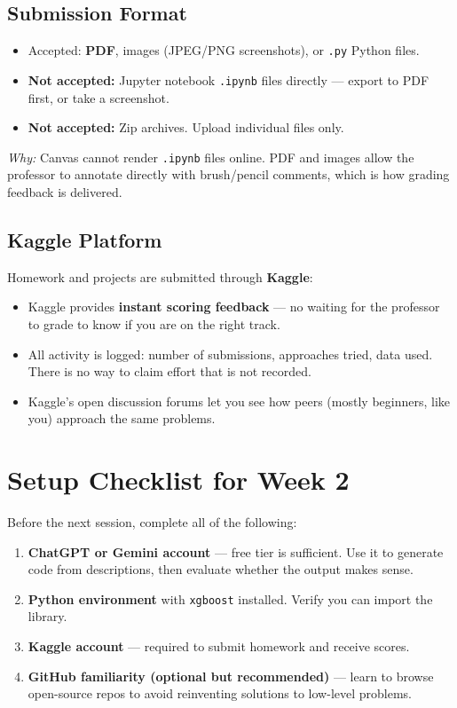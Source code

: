 \documentclass[11pt]{article}
\begin{document}
\subsection{Submission Format}
\begin{itemize}
    \item Accepted: \textbf{PDF}, images (JPEG/PNG screenshots), or \texttt{.py} Python files.
    \item \textbf{Not accepted:} Jupyter notebook \texttt{.ipynb} files directly --- export to PDF first, or take a screenshot.
    \item \textbf{Not accepted:} Zip archives. Upload individual files only.
\end{itemize}

\textit{Why:} Canvas cannot render \texttt{.ipynb} files online. PDF and images allow the professor to annotate directly with brush/pencil comments, which is how grading feedback is delivered.

\subsection{Kaggle Platform}
Homework and projects are submitted through \textbf{Kaggle}:
\begin{itemize}
    \item Kaggle provides \textbf{instant scoring feedback} --- no waiting for the professor to grade to know if you are on the right track.
    \item All activity is logged: number of submissions, approaches tried, data used. There is no way to claim effort that is not recorded.
    \item Kaggle's open discussion forums let you see how peers (mostly beginners, like you) approach the same problems.
\end{itemize}

\newpage
\section{Setup Checklist for Week 2}

Before the next session, complete all of the following:

\begin{enumerate}
    \item \textbf{ChatGPT or Gemini account} --- free tier is sufficient. Use it to generate code from descriptions, then evaluate whether the output makes sense.
    \item \textbf{Python environment} with \texttt{xgboost} installed. Verify you can import the library.
    \item \textbf{Kaggle account} --- required to submit homework and receive scores.
    \item \textbf{GitHub familiarity (optional but recommended)} --- learn to browse open-source repos to avoid reinventing solutions to low-level problems.
\end{enumerate}
\end{document}
